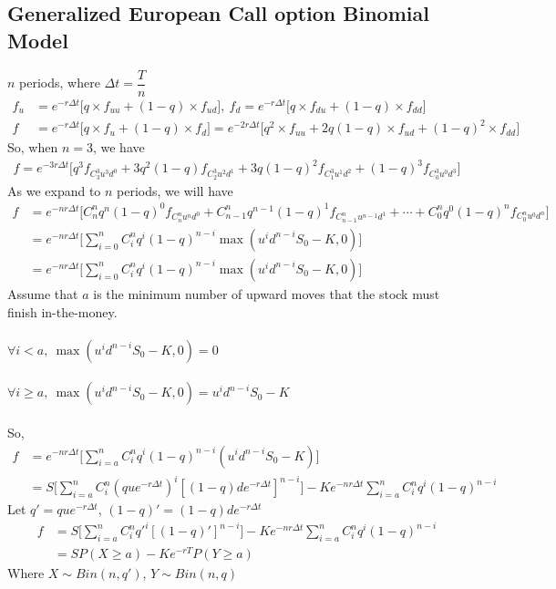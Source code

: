 \documentclass[12pt]{article}
\begin{document}
\subsection*{Generalized European Call option Binomial Model}
$n$ periods, where $\Delta t = \dfrac{T}{n}$ 
\begin{align*}
    f_u &= e^{-r\Delta t}\Big[q\times f_{uu} + (1-q)\times f_{ud}\Big],\ f_d = e^{-r\Delta t}\Big[q\times f_{du} + (1-q)\times f_{dd}\Big]\\
    f &= e^{-r\Delta t}\Big[q\times f_u + (1-q)\times f_d\Big] = e^{-2r\Delta t}\Big[q^2\times f_{uu} + 2q(1-q)\times f_{ud} + (1-q)^2\times f_{dd}\Big]
\end{align*}
So, when $n = 3$, we have
\begin{align*}
    f = e^{-3r\Delta t}\Big[q^3 f_{C_3^3 u^3 d^0} + 3q^2(1-q)f_{C^3_2 u^2 d^1} + 3q(1-q)^2 f_{C^3_1 u^1 d^2} + (1-q)^3 f_{C^3_0 u^0d^3}\Big]
\end{align*}
As we expand to $n$ periods, we will have
\begin{align*}
   f &= e^{-nr\Delta t}\Big[C^n_n q^n(1-q)^0 f_{C_n^n u^n d^0} + C^n_{n-1}q^{n-1}(1-q)^1f_{C_{n-1}^{n} u^{n-1} d^1} + \cdots + C^n_0 q^0(1-q)^n f_{C_0^n u^0d^n}\Big]\\
   & = e^{-nr\Delta t}\Big[\sum_{i=0}^n C^n_i q^i(1-q)^{n-i} \max(u^id^{n-i}S_0-K, 0)\Big]\\
   & = e^{-nr\Delta t}\Big[\sum_{i=0}^n C^n_i q^i(1-q)^{n-i} \max(u^id^{n-i}S_0-K, 0)\Big]
\end{align*} 
Assume that $a$ is the minimum number of upward moves that the stock must finish in-the-money.\\\\
$\forall i < a,\ \max(u^id^{n-i}S_0-K, 0) = 0$\\\\
$\forall i \geq a,\ \max(u^id^{n-i}S_0-K, 0) = u^id^{n-i}S_0-K$\\\\
So, 
\begin{align*}
   f & = e^{-nr\Delta t}\Big[\sum_{i=a}^n C^n_i q^i(1-q)^{n-i} (u^id^{n-i}S_0-K)\Big]\\
   & = S\Big[\sum_{i=a}^n C^n_i (que^{-r\Delta t})^i[(1-q)de^{-r\Delta t}]^{n-i}\Big]- Ke^{-nr\Delta t}\sum_{i=a}^n C^n_i q^i(1-q)^{n-i}
\end{align*}
Let $q' = que^{-r\Delta t}$, $(1-q)' = (1-q)de^{-r\Delta t}$
\begin{align*}
    f &= S\Big[\sum_{i=a}^n C^n_i q'^i[(1-q)']^{n-i}\Big]- Ke^{-nr\Delta t}\sum_{i=a}^n C^n_i q^i(1-q)^{n-i}\\
    & = SP(X\ge a) - Ke^{-rT}P(Y\ge a)
\end{align*}
Where $X\sim Bin(n, q')$, $Y\sim Bin(n, q)$
\end{document}
